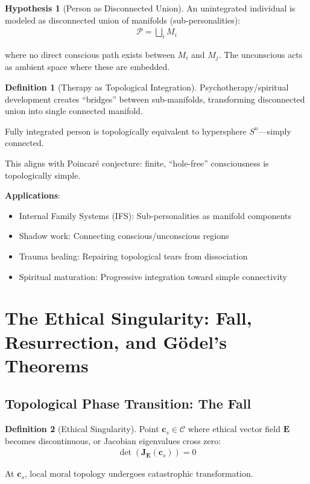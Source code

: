 \documentclass[11pt,a4paper]{article}
\theoremstyle{definition}
\newtheorem{definition}{Definition}[section]
\newtheorem{hypothesis}{Hypothesis}[section]
\theoremstyle{remark}
\newcommand{\CC}{\mathcal{C}}
\newcommand{\EE}{\mathbf{E}}
\newcommand{\cc}{\mathbf{c}}
\begin{document}
\begin{hypothesis}[Person as Disconnected Union]
An unintegrated individual is modeled as disconnected union of manifolds (sub-personalities):
\begin{align}
\mathcal{P} = \bigsqcup_{i} M_i
\end{align}

where no direct conscious path exists between \(M_i\) and \(M_j\). The unconscious acts as ambient space where these are embedded.
\end{hypothesis}

\begin{definition}[Therapy as Topological Integration]
Psychotherapy/spiritual development creates ``bridges'' between sub-manifolds, transforming disconnected union into single connected manifold.

Fully integrated person is topologically equivalent to hypersphere \(S^n\)—simply connected.

This aligns with Poincaré conjecture: finite, ``hole-free'' consciousness is topologically simple.
\end{definition}

\textbf{Applications}:
\begin{itemize}
\item Internal Family Systems (IFS): Sub-personalities as manifold components
\item Shadow work: Connecting conscious/unconscious regions
\item Trauma healing: Repairing topological tears from dissociation
\item Spiritual maturation: Progressive integration toward simple connectivity
\end{itemize}

\section{The Ethical Singularity: Fall, Resurrection, and Gödel's Theorems}

\subsection{Topological Phase Transition: The Fall}

\begin{definition}[Ethical Singularity]
Point \(\cc_s \in \CC\) where ethical vector field \(\EE\) becomes discontinuous, or Jacobian eigenvalues cross zero:
\begin{align}
\det(\mathbf{J}_{\EE}(\cc_s)) = 0
\end{align}

At \(\cc_s\), local moral topology undergoes catastrophic transformation.
\end{definition}
\end{document}
